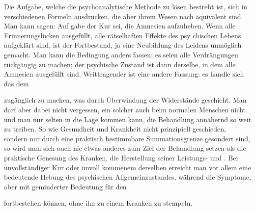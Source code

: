 \documentclass[twoside=true,titlepage=false,open=any, parskip=never, fontsize=10pt, headings=small, chapterprefix=false, appendixprefix=false]{scrbook}
\begin{document}
        \pstart
        Die Aufgabe, welche die psychoanalytische Methode zu lösen
 bestrebt ist,  sich in verschiedenen Formeln ausdrücken, die
 aber ihrem Wesen nach
               äquivalent sind. Man kann sagen: Auf
gabe der Kur sei, die Amnesien
               aufzuheben. Wenn alle
 Erinnerungslücken ausgefüllt, alle rätselhaften Effekte
               des psy
chischen Lebens aufgeklärt sind, ist der Fortbestand, ja
               eine
 Neubildung des Leidens unmöglich gemacht. Man kann die
 Bedingung
               anders fassen: es seien alle Verdrängungen rückgängig
 zu machen; der psychische
               Zustand ist dann derselbe, in dem
 alle Amnesien ausgefüllt sind. Weittragender
               ist eine andere
 Fassung: es handle sich  das  dem 

 zugänglich zu machen, was durch Überwindung der Widerstände
               geschieht. Man darf aber dabei nicht vergessen,  ein solcher
 auch beim normalen Menschen nicht  und
 man nur selten in die Lage kommen kann, die Behandlung
 annähernd so weit
               zu treiben. So wie Gesundheit und Krankheit
 nicht prinzipiell geschieden,
               sondern nur durch eine praktisch
 bestimmbare Summationsgrenze gesondert sind, so
               wird man sich
 auch nie etwas anderes zum Ziel der Behandlung setzen als die
               praktische Genesung des Kranken, die Herstellung seiner Leistungs- 
 und . Bei unvollständiger Kur oder unvoll
kommenem  derselben erreicht man vor allem eine
 bedeutende Hebung des psychischen
               Allgemeinzustandes, während
 die Symptome, aber mit geminderter Bedeutung für den 

 fortbestehen können, ohne ihn zu einem Kranken zu stempeln.
        \pend
    
\end{document}
